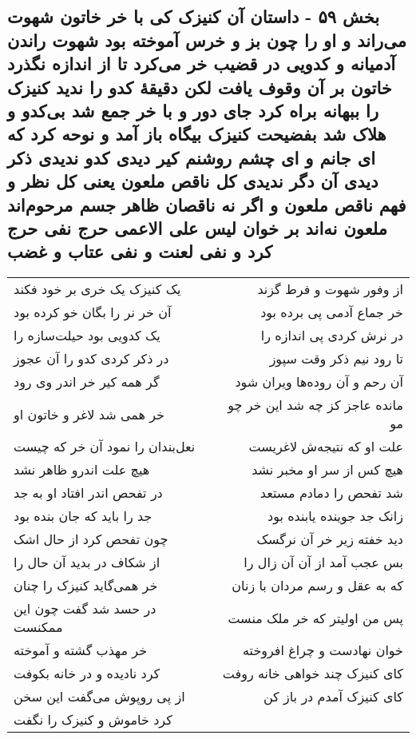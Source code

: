 \begin{center}
\section*{بخش ۵۹ - داستان آن کنیزک کی با خر خاتون شهوت می‌راند و او را چون بز و خرس آموخته بود شهوت راندن آدمیانه و کدویی در قضیب خر می‌کرد تا از اندازه نگذرد خاتون بر آن وقوف یافت لکن دقیقهٔ کدو را ندید کنیزک را ببهانه براه کرد جای دور و با خر جمع شد بی‌کدو و  هلاک شد بفضیحت کنیزک بیگاه باز آمد و نوحه کرد که ای جانم و ای چشم روشنم کیر دیدی کدو ندیدی ذکر دیدی آن دگر ندیدی کل ناقص ملعون یعنی کل نظر و فهم ناقص ملعون و اگر نه ناقصان ظاهر  جسم مرحوم‌اند ملعون نه‌اند بر خوان لیس علی الاعمی حرج نفی حرج  کرد و نفی لعنت و نفی عتاب و غضب}
\label{sec:sh059}
\begin{longtable}{l p{0.5cm} r}
یک کنیزک یک خری بر خود فکند
&&
از وفور شهوت و فرط گزند
\\
آن خر نر را بگان خو کرده بود
&&
خر جماع آدمی پی برده بود
\\
یک کدویی بود حیلت‌سازه را
&&
در نرش کردی پی اندازه را
\\
در ذکر کردی کدو را آن عجوز
&&
تا رود نیم ذکر وقت سپوز
\\
گر همه کیر خر اندر وی رود
&&
آن رحم و آن روده‌ها ویران شود
\\
خر همی شد لاغر و خاتون او
&&
مانده عاجز کز چه شد این خر چو مو
\\
نعل‌بندان را نمود آن خر که چیست
&&
علت او که نتیجه‌ش لاغریست
\\
هیچ علت اندرو ظاهر نشد
&&
هیچ کس از سر او مخبر نشد
\\
در تفحص اندر افتاد او به جد
&&
شد تفحص را دمادم مستعد
\\
جد را باید که جان بنده بود
&&
زانک جد جوینده یابنده بود
\\
چون تفحص کرد از حال اشک
&&
دید خفته زیر خر آن نرگسک
\\
از شکاف در بدید آن حال را
&&
بس عجب آمد از آن آن زال را
\\
خر همی‌گاید کنیزک را چنان
&&
که به عقل و رسم مردان با زنان
\\
در حسد شد گفت چون این ممکنست
&&
پس من اولیتر که خر ملک منست
\\
خر مهذب گشته و آموخته
&&
خوان نهادست و چراغ افروخته
\\
کرد نادیده و در خانه بکوفت
&&
کای کنیزک چند خواهی خانه روفت
\\
از پی روپوش می‌گفت این سخن
&&
کای کنیزک آمدم در باز کن
\\
کرد خاموش و کنیزک را نگفت

\end{longtable}
\end{center}
